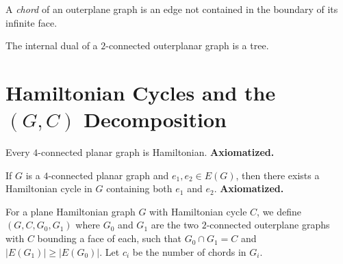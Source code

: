 \begin{definition}[Chord]
  \label{def:chord}
  \notready
  A \emph{chord} of an outerplane graph is an edge not contained in the
  boundary of its infinite face.
\end{definition}

\begin{lemma}
  \label{lem:outerplanar_dual_tree}
  \notready
  The internal dual of a $2$-connected outerplanar graph is a tree.
\end{lemma}


\section{Hamiltonian Cycles and the $(G,C)$ Decomposition}

\begin{theorem}
  \label{thm:tutte}
  \notready
  Every $4$-connected planar graph is Hamiltonian. \textbf{Axiomatized.}
\end{theorem}

\begin{theorem}
  \label{thm:sanders}
  \notready
  If $G$ is a $4$-connected planar graph and $e_1, e_2 \in E(G)$, then
  there exists a Hamiltonian cycle in $G$ containing both $e_1$ and $e_2$.
  \textbf{Axiomatized.}
\end{theorem}

\begin{definition}
  \label{def:ham_decomp}
  \notready
  For a plane Hamiltonian graph $G$ with Hamiltonian cycle $C$, we define
  $(G, C, G_0, G_1)$ where $G_0$ and $G_1$ are the two $2$-connected
  outerplane graphs with $C$ bounding a face of each, such that
  $G_0 \cap G_1 = C$ and $|E(G_1)| \ge |E(G_0)|$. Let $c_i$ be the number
  of chords in $G_i$.
\end{definition}

